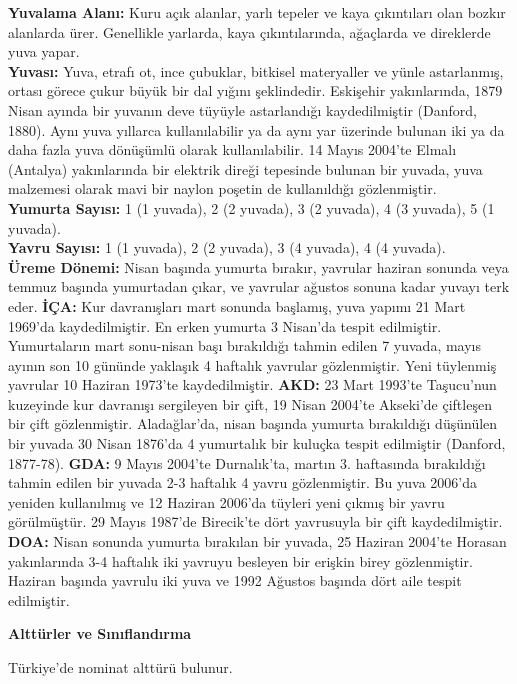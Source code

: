 \documentclass[
  a4paper,
  DIV=11,
  numbers=noendperiod]{scrreprt}
\begin{document}
\textbf{Yuvalama Alanı:} Kuru açık alanlar, yarlı tepeler ve kaya
çıkıntıları olan bozkır alanlarda ürer. Genellikle yarlarda, kaya
çıkıntılarında, ağaçlarda ve direklerde yuva yapar.\\
\textbf{Yuvası:} Yuva, etrafı ot, ince çubuklar, bitkisel materyaller ve
yünle astarlanmış, ortası görece çukur büyük bir dal yığını şeklindedir.
Eskişehir yakınlarında, 1879 Nisan ayında bir yuvanın deve tüyüyle
astarlandığı kaydedilmiştir (Danford, 1880). Aynı yuva yıllarca
kullanılabilir ya da aynı yar üzerinde bulunan iki ya da daha fazla yuva
dönüşümlü olarak kullanılabilir. 14 Mayıs 2004'te Elmalı (Antalya)
yakınlarında bir elektrik direği tepesinde bulunan bir yuvada, yuva
malzemesi olarak mavi bir naylon poşetin de kullanıldığı gözlenmiştir.\\
\textbf{Yumurta Sayısı:} 1 (1 yuvada), 2 (2 yuvada), 3 (2 yuvada), 4 (3
yuvada), 5 (1 yuvada).\\
\textbf{Yavru Sayısı:} 1 (1 yuvada), 2 (2 yuvada), 3 (4 yuvada), 4 (4
yuvada).\\
\textbf{Üreme Dönemi:} Nisan başında yumurta bırakır, yavrular haziran
sonunda veya temmuz başında yumurtadan çıkar, ve yavrular ağustos sonuna
kadar yuvayı terk eder. \textbf{İÇA:} Kur davranışları mart sonunda
başlamış, yuva yapımı 21 Mart 1969'da kaydedilmiştir. En erken yumurta 3
Nisan'da tespit edilmiştir. Yumurtaların mart sonu-nisan başı
bırakıldığı tahmin edilen 7 yuvada, mayıs ayının son 10 gününde yaklaşık
4 haftalık yavrular gözlenmiştir. Yeni tüylenmiş yavrular 10 Haziran
1973'te kaydedilmiştir. \textbf{AKD:} 23 Mart 1993'te Taşucu'nun
kuzeyinde kur davranışı sergileyen bir çift, 19 Nisan 2004'te Akseki'de
çiftleşen bir çift gözlenmiştir. Aladağlar'da, nisan başında yumurta
bırakıldığı düşünülen bir yuvada 30 Nisan 1876'da 4 yumurtalık bir
kuluçka tespit edilmiştir (Danford, 1877-78). \textbf{GDA:} 9 Mayıs
2004'te Durnalık'ta, martın 3. haftasında bırakıldığı tahmin edilen bir
yuvada 2-3 haftalık 4 yavru gözlenmiştir. Bu yuva 2006'da yeniden
kullanılmış ve 12 Haziran 2006'da tüyleri yeni çıkmış bir yavru
görülmüştür. 29 Mayıs 1987'de Birecik'te dört yavrusuyla bir çift
kaydedilmiştir. \textbf{DOA:} Nisan sonunda yumurta bırakılan bir
yuvada, 25 Haziran 2004'te Horasan yakınlarında 3-4 haftalık iki yavruyu
besleyen bir erişkin birey gözlenmiştir. Haziran başında yavrulu iki
yuva ve 1992 Ağustos başında dört aile tespit edilmiştir.

\textbf{Alttürler ve Sınıflandırma}

Türkiye'de nominat alttürü bulunur.
\end{document}
